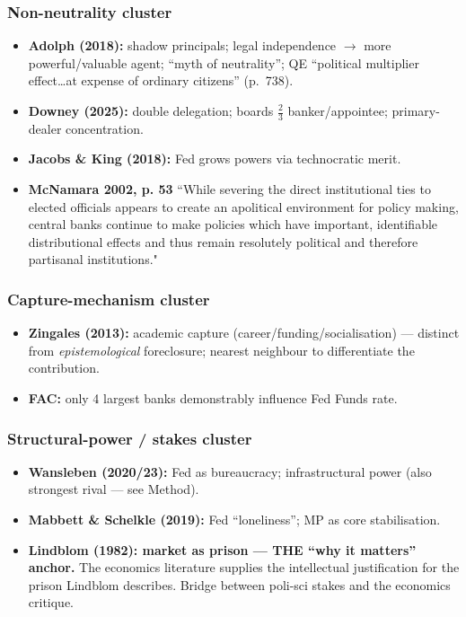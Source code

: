 \documentclass[12pt,a4paper]{article}
\begin{document}
\begin{doublespace}
\subsubsection{Non-neutrality cluster}
\begin{itemize}
    \item \textbf{Adolph (2018):} shadow principals; legal independence $\rightarrow$ more powerful/valuable agent; ``myth of neutrality''; QE ``political multiplier effect\ldots at expense of ordinary citizens'' (p.\ 738).
    \item \textbf{Downey (2025):} double delegation; boards $\frac{2}{3}$ banker/appointee; primary-dealer concentration.
    \item \textbf{Jacobs \& King (2018):} Fed grows powers via technocratic merit.
    \item \textbf{McNamara 2002, p. 53} ``While severing the direct institutional ties to elected officials appears to create an apolitical environment for policy making, central banks continue to make policies which have important, identifiable distributional effects and thus remain resolutely political and therefore partisanal institutions."
\end{itemize}

\subsubsection{Capture-mechanism cluster}
\begin{itemize}
    \item \textbf{Zingales (2013):} academic capture (career/funding/socialisation) --- distinct from \textit{epistemological} foreclosure; nearest neighbour to differentiate the contribution.
    \item \textbf{FAC:} only 4 largest banks demonstrably influence Fed Funds rate.
\end{itemize}

\subsubsection{Structural-power / stakes cluster}
\begin{itemize}
    \item \textbf{Wansleben (2020/23):} Fed as bureaucracy; infrastructural power (also strongest rival --- see Method).
    \item \textbf{Mabbett \& Schelkle (2019):} Fed ``loneliness''; MP as core stabilisation.
    \item \textbf{Lindblom (1982): market as prison --- THE ``why it matters'' anchor.} The economics literature supplies the intellectual justification for the prison Lindblom describes. Bridge between poli-sci stakes and the economics critique.
\end{itemize}


\end{doublespace}
\end{document}
